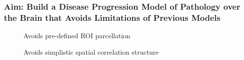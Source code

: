 \documentclass[8pt,xcolor=table]{beamer}
\begin{document}
\begin{frame}
\frametitle{Aim: Build a Disease Progression Model of Pathology over the Brain that Avoids Limitations of Previous Models}


\newcommand{\aimImgScale}{0.8}
\newcommand{\mnpHeight}{3cm}

\vspace{-2em}

\begin{figure}[h]
  \centering
  \begin{minipage}[t][\mnpHeight][t]{0.3\textwidth}
   \centering
   Avoids pre-defined ROI parcellation\\
  \end{minipage}
   \begin{minipage}[t][\mnpHeight][t]{0.3\textwidth}
  \centering
  Avoids simplistic spatial correlation structure\\
  \vspace{0.5em}

\end{minipage}
\end{figure}
\end{frame}
\end{document}
